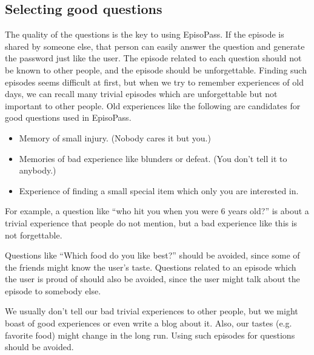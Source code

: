 \documentclass[runningheads,a4paper]{llncs}
\begin{document}
\subsection{Selecting good questions}


The quality of the questions is the key to using EpisoPass.
If the episode is shared by someone else,
that person can easily answer the question and generate the
password just like the user.
%
The episode related to each question should not be known to other people,
and the episode should be unforgettable.
%
Finding such episodes seems difficult at first, but
when we try to remember experiences of old days,
we can recall many trivial episodes which are unforgettable but
not important to other people.
%
Old experiences like the following are candidates for
good questions used in EpisoPass.

\begin{itemize}
\item Memory of small injury. (Nobody cares it but you.)

\item Memories of bad experience like blunders or defeat.
(You don't tell it to anybody.)

\item Experience of finding a small special item which only you are interested in.
\end{itemize}

For example, a question like
``who hit you when you were 6 years old?''
is about a trivial experience that people do not mention,
but a bad experience like this is not forgettable.

Questions like ``Which food do you like best?'' should be avoided,
since some of the friends might know the user's taste.
Questions related to an episode which the user is proud of should also be
avoided, since the user might talk about the episode to somebody else.

We usually don't tell our bad trivial experiences to other people,
but we might boast of good experiences or even write a blog about it.
Also, our tastes (e.g. favorite food) might change in the long run.
Using such episodes for questions should be avoided.

% 
% 
% 
% 
\end{document}
